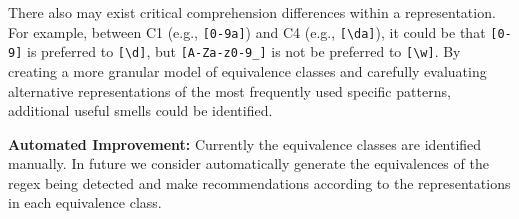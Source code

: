 There also may exist critical comprehension differences within a representation. For example, between C1 (e.g., \verb![0-9a]!) and C4 (e.g., \verb![\da]!), it could be that \verb![0-9]! is preferred to \verb![\d]!, but \verb![A-Za-z0-9_]! is not be preferred to \verb![\w]!.
By creating a more granular model of equivalence classes and carefully evaluating alternative representations of the most frequently used specific patterns, additional useful smells could be identified.

\noindent \textbf{Automated Improvement:}
Currently the equivalence classes are identified manually. In future we consider automatically generate the equivalences of the regex being detected and make recommendations according to the representations in each equivalence class.

\iffalse
\noindent \textbf{Community-specific Comprehension:}
A straightforward way to assess understandability is to directly ask software professionals which regexes they prefer and why.
In our evaluation, we did not focus on a specific community or a specific regex purpose (e.g., validating e-mail address, validating IP-address, parsing URLs).
 If an understandability study used regexes sampled from the codebase of a specific community (e.g., most frequently observed regexes, most buggy regexes, regexes on the hottest execution paths, etc.), and measured the understanding of programming professionals working in that community, then the measurements and the refactoring they imply would be more likely to have a direct impact.
 \fi
%

